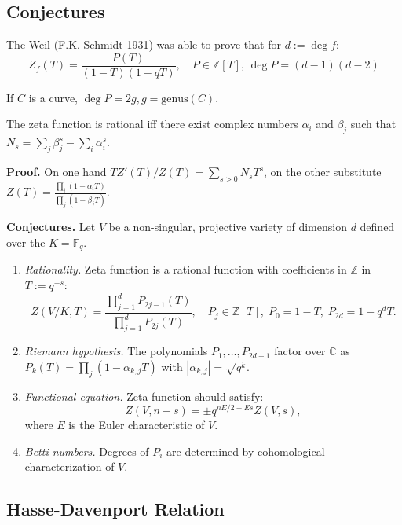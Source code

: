 \documentclass{template}
\begin{document}
\subsection{Conjectures}
The Weil (F.K. Schmidt 1931) was able to prove that for $d:=\deg f$:
\begin{equation*}
    Z_f(T) = \frac{P(T)}{(1-T)(1-qT)}, \quad P \in \mathbb{Z}[T], \, \deg P = (d-1)(d-2)
\end{equation*}

If $C$ is a curve, $\deg P = 2g, g=\text{genus}(C)$.


\begin{proposition}
    The zeta function is rational iff there exist complex numbers $\alpha_i$ and $\beta_j$
    such that $N_s = \sum_j \beta_j^s - \sum_i \alpha_i^s$.
\end{proposition}

\textbf{Proof.} On one hand $TZ'(T)/Z(T) = \sum_{s > 0}N_sT^s$, on the other
substitute $Z(T) = \frac{\prod_i (1-\alpha_iT)}{\prod_j (1-\beta_jT)}$.

\textbf{Conjectures.} Let $V$ be a non-singular, projective variety of 
dimension $d$ defined over the $K=\mathbb{F}_q$.
\begin{enumerate}
    \item \textit{Rationality.} Zeta function is a rational function 
    with coefficients in $\mathbb{Z}$ in $T := q^{-s}$:
    \begin{equation*}
        Z(V/K, T) = \frac{\prod_{j=1}^d P_{2j-1}(T)}{\prod_{j=1}^d P_{2j}(T)}, \quad P_j \in \mathbb{Z}[T], \; P_0 = 1-T, \; P_{2d} = 1-q^dT.
    \end{equation*}
    \item \textit{Riemann hypothesis.} The polynomials $P_1,\dots,P_{2d-1}$
    factor over $\mathbb{C}$ as $P_k(T) = \prod_j (1-\alpha_{k,j}T)$ with
    $|\alpha_{k,j}| = \sqrt{q^k}$.
    \item \textit{Functional equation.} Zeta function should satisfy:
    \begin{equation*}
        Z(V, n-s) = \pm q^{nE/2 - Es}Z(V, s),
    \end{equation*}
    where $E$ is the Euler characteristic of $V$.
    \item \textit{Betti numbers.} Degrees of $P_i$ are determined by cohomological 
    characterization of $V$.
\end{enumerate}

\subsection{Hasse-Davenport Relation}
\end{document}
